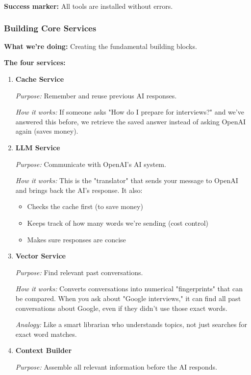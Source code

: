\documentclass[12pt,a4paper]{article}
\begin{document}
\textbf{Success marker:} All tools are installed without errors.

\subsubsection{Building Core Services }

\textbf{What we're doing:} Creating the fundamental building blocks.

\textbf{The four services:}

\begin{enumerate}
  \item \textbf{Cache Service }

  \textit{Purpose:} Remember and reuse previous AI responses.

  \textit{How it works:} If someone asks "How do I prepare for interviews?" and we've answered this before, we retrieve the saved answer instead of asking OpenAI again (saves money).

  \item \textbf{LLM Service }

  \textit{Purpose:} Communicate with OpenAI's AI system.

  \textit{How it works:} This is the "translator" that sends your message to OpenAI and brings back the AI's response. It also:
  \begin{itemize}
    \item Checks the cache first (to save money)
    \item Keeps track of how many words we're sending (cost control)
    \item Makes sure responses are concise
  \end{itemize}

  \item \textbf{Vector Service }

  \textit{Purpose:} Find relevant past conversations.

  \textit{How it works:} Converts conversations into numerical "fingerprints" that can be compared. When you ask about "Google interviews," it can find all past conversations about Google, even if they didn't use those exact words.

  \textit{Analogy:} Like a smart librarian who understands topics, not just searches for exact word matches.

  \item \textbf{Context Builder }

  \textit{Purpose:} Assemble all relevant information before the AI responds.


\end{enumerate}
\end{document}
